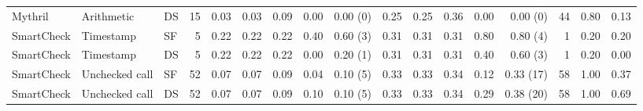 \begin{tabular}{@{}lllrrrrrrrrrrrrrr@{}}
Mythril & Arithmetic & DS & 15 & 0.03 & 0.03 & 0.09 & 0.00 & 0.00 (0) & 0.25 & 0.25 & 0.36 & 0.00 & 0.00 (0) & 44 & 0.80 & 0.13\\
SmartCheck & Timestamp & SF & 5 & 0.22 & 0.22 & 0.22 & 0.40 & 0.60 (3) & 0.31 & 0.31 & 0.31 & 0.80 & 0.80 (4) & 1 & 0.20 & 0.20\\
SmartCheck & Timestamp & DS & 5 & 0.22 & 0.22 & 0.22 & 0.00 & 0.20 (1) & 0.31 & 0.31 & 0.31 & 0.40 & 0.60 (3) & 1 & 0.20 & 0.00\\
SmartCheck & Unchecked call & SF & 52 & 0.07 & 0.07 & 0.09 & 0.04 & 0.10 (5) & 0.33 & 0.33 & 0.34 & 0.12 & 0.33 (17) & 58 & 1.00 & 0.37\\
SmartCheck & Unchecked call & DS & 52 & 0.07 & 0.07 & 0.09 & 0.10 & 0.10 (5) & 0.33 & 0.33 & 0.34 & 0.29 & 0.38 (20) & 58 & 1.00 & 0.69\\
\bottomrule
\end{tabular}
